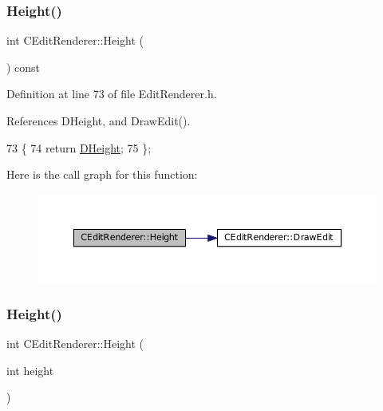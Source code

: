 \subsubsection{\texorpdfstring{Height()}{Height()}\hspace{0.1cm}{\footnotesize\ttfamily [1/2]}}
{\footnotesize\ttfamily int C\+Edit\+Renderer\+::\+Height (\begin{DoxyParamCaption}{ }\end{DoxyParamCaption}) const\hspace{0.3cm}{\ttfamily [inline]}}



Definition at line 73 of file Edit\+Renderer.\+h.



References D\+Height, and Draw\+Edit().


\begin{DoxyCode}
73                           \{
74             \textcolor{keywordflow}{return} \hyperlink{classCEditRenderer_ade8dedb4f9790d28b38da8ef20a171cb}{DHeight};    
75         \};
\end{DoxyCode}
Here is the call graph for this function\+:\nopagebreak
\begin{figure}[H]
\begin{center}
\leavevmode
\includegraphics[width=350pt]{classCEditRenderer_ad5ad32a8ae2372e21bb9365a6b6d0f59_cgraph}
\end{center}
\end{figure}
\hypertarget{classCEditRenderer_ab3c2442f35049d3fa57a173e68043bfa}{}\label{classCEditRenderer_ab3c2442f35049d3fa57a173e68043bfa} 
\subsubsection{\texorpdfstring{Height()}{Height()}\hspace{0.1cm}{\footnotesize\ttfamily [2/2]}}
{\footnotesize\ttfamily int C\+Edit\+Renderer\+::\+Height (\begin{DoxyParamCaption}\item[{int}]{height }\end{DoxyParamCaption})}



